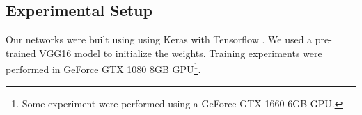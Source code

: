 \subsection{Experimental Setup}
\label{cap5_experimental_setup}

Our networks were built using using Keras \cite{chollet2015keras} with Tensorflow \cite{tensorflow2015-whitepaper}. 
We used a pre-trained VGG16 model to initialize the weights. 
Training experiments were performed in GeForce GTX 1080 8GB GPU\footnote{Some experiment were performed using a GeForce GTX 1660 6GB GPU.}.

\begin{comment}
\subsection{Dataset Visualization}
\label{cap5_dataset_visualization}

{\color{blue}


The understanding of information can be facilitated with the aid of visual representation and data presentation.
Both can help in the perception, interpretation and understanding of information.
It also can be used to summarize information and give diferent perspective of information than can't be seen without these techniques \cite{Kirk:2016}.

Data visualization can also be used as an initial step during a machine learning process.
In 1973, \cite{Anscombe:1973} showed that basic statistics such as mean, standard deviation and correlation, may not provide enough information about the data.
Then, visualize datasets can provide insights, help to understanding the problem and assist in selecting important features for learning \cite{Marsland:2014}.

Despite importance of visualization, as indicated previously, translate raw data into useful images to provide information can be challenging.
Identify relationships among features, detect patterns and relevant profiles to improve decision-making, and also present the best representation for the information could be not be a easy task \cite{Vellido:2011}.
Then, some works like \cite{Wilkinson:2016}, \cite{Chang:2016} and \cite{Michailidis:2016}, can provide some inspiration to represent some data, like graphs and trees.

In addition to representing unstructured data, visualization have been used to help understand black-box methods.
Such methods, such as neural networks, do not provide information about learning and despite the good results, they are often questioned in some areas (eg. medicine). 
Visual representation of how networks learn can provide greater confidence, making it possible to expand the use of machine learning techniques \cite{Chatzimparmpas:2020}.


\end{comment}
